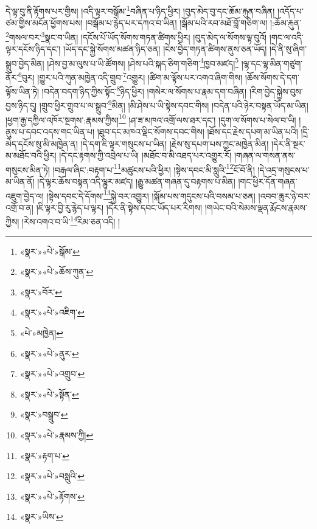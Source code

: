 དེ་ལྟ་བུ་ནི་རྟོགས་པར་གྱིས། །འདི་ལྟར་བསྒོམ་\footnote{«སྣར་»«པེ་»སྒོམ་}བཞིན་པ་ཉིད་ཕྱིར། །བུད་མེད་བུ་དང་ཆོམ་རྐུན་བཞིན། །འདོད་པ་ཙམ་གྱིས་མངོན་ཕྱོགས་པས། །བསྒོམ་པ་རྙེད་པར་དཀའ་བ་ཡིན། །སྒོམ་པའི་རབ་མཐོ་བློ་གཅིག་ལ། །:ཆོམ་རྐུན་\footnote{«སྣར་»«པེ་»ཆོས་ཀུན་}གསལ་བར་\footnote{«སྣར་»བོར་}སྣང་བ་ཡིན། །དངོས་པོ་ཡོད་སོགས་གཏན་ཚིགས་ཕྱིར། །བུད་མེད་ལ་སོགས་ལྟ་བུའོ། །གང་ལ་འདི་ལྟར་དངོས་ཉིད་དང་། །ཡོད་དང་སྐྱེ་སོགས་མཚན་ཉིད་ཅན། །ངེས་བྱེད་གཏན་ཚིགས་ནུས་ཅན་ཡོད། །དེ་ནི་སུ་ཞིག་སྒྲུབ་བྱེད་མིན། །ཤེས་བྱ་མ་ལུས་པ་ཡི་ཚོགས། །ཤེས་པའི་སྐད་ཅིག་གཅིག་\footnote{«སྣར་»«པེ་»འཇིག་}ཁྱབ་མཛད།\footnote{«པེ་»མཁྱེན།} །ལྷ་དང་ལྷ་མིན་གཙུག་ནོར་\footnote{«སྣར་»«པེ་»ནུར་}བུར། །གྱུར་པའི་ཀུན་མཁྱེན་འདི་གྲུབ་\footnote{«སྣར་»«པེ་»འགྲུབ་}འགྱུར། །ཚིག་མ་ལྟོས་པར་འགའ་ཞིག་གིས། །ཆོས་སོགས་དེ་དག་ལྟོས་ཡིན་ཏེ། །བདེན་བདག་ཉིད་ཀྱིས་སྟོང་\footnote{«སྣར་»«པེ་»སྟོན་}ཉིད་ཕྱིར། །གསེར་ལ་སོགས་པ་རྣམ་དག་བཞིན། །རིག་བྱེད་སྐྱེས་བུས་བྱས་ཉིད་དུ། །གྲུབ་ཕྱིར་གྲུབ་པ་ལ་སྒྲུབ་\footnote{«སྣར་»བསྒྲུབ་}མིན། །མི་ཤེས་པ་ཡི་སྟེས་དབང་གིས། །བདེན་པའི་ཉེར་བསྟན་ཡོད་མ་ཡིན། །ཕྱག་རྒྱ་དཀྱིལ་འཁོར་སྔགས་:རྣམས་ཀྱིས།\footnote{«སྣར་»«པེ་»རྣམས་ཀྱི།} །ཤ་ཟ་མཁའ་འགྲོ་ལས་ཐར་དང་། །དུག་ལ་སོགས་པ་སེལ་བ་ཡི། །ནུས་པ་དབང་འདས་གང་ཡིན་པ། །ཐུབ་དང་མཁའ་ལྡིང་སོགས་དབང་གིས། །ཐོས་དང་རྗེས་དཔག་མ་ཡིན་པའི། །དྲི་མེད་དངོས་སུ་མི་མཁྱེན་ན། །དེ་དག་ཇི་ལྟར་གསུངས་པ་ཡིན། །རྗེས་སུ་དཔག་པས་ཀྱང་མཁྱེན་མིན། །དེར་ནི་སྔར་མ་མཐོང་བའི་ཕྱིར། །དེ་དང་རྟགས་ཀྱི་འབྲེལ་པ་ཡི། །མཐོང་བ་མི་འཐད་པར་འགྱུར་རོ། །གཞན་ལ་གསན་ནས་གསུངས་མིན་ཏེ། །བརྒལ་ཞིང་:བརྟག་པ་\footnote{«སྣར་»རྟག་པ་}མཚུངས་པའི་ཕྱིར། །སྟེས་དབང་མི་སླུའི་\footnote{«སྣར་»«པེ་»བསླུའི་}ངོ་བོ་ནི། །དེ་འདྲ་གསུངས་པ་མ་ཡིན་ནོ། །དེ་ལྟར་ཆོས་བསྟན་འདི་ལྷུར་མཛད། །རྒྱུ་མཚན་གཞན་དུ་བརྟགས་པ་མིན། །གང་ཕྱིར་དོན་གཞན་འཇུག་བྱེད་ལ། །སྟེས་དབང་དེ་དོགས་\footnote{«སྣར་»«པེ་»རྟོགས་}སྐྱེ་བར་འགྱུར། །སྐོམ་པས་གདུངས་པའི་བསམ་པ་ཅན། །འབབ་ཆུར་ཉེ་བར་འགྲོ་བ་ན། །ཇི་ལྟར་བྱི་རུ་རྙེད་པ་ལྟར། །དེར་ནི་སྟེས་དབང་ཡོད་པར་རིགས། །གཡེང་བའི་སེམས་ལྡན་རྨོངས་རྣམས་ཀྱིས། །རེས་འགའ་བ་ཡི་\footnote{«སྣར་»ཡིས་}རིམ་ཅན་འདི། །
